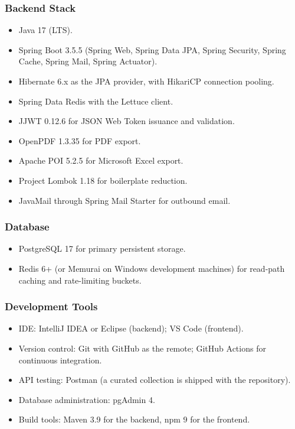 \subsubsection{Backend Stack}
\begin{itemize}
    \item Java 17 (LTS).
    \item Spring Boot 3.5.5 (Spring Web, Spring Data JPA, Spring Security, Spring Cache, Spring Mail, Spring Actuator).
    \item Hibernate 6.x as the JPA provider, with HikariCP connection pooling.
    \item Spring Data Redis with the Lettuce client.
    \item JJWT 0.12.6 for JSON Web Token issuance and validation.
    \item OpenPDF 1.3.35 for PDF export.
    \item Apache POI 5.2.5 for Microsoft Excel export.
    \item Project Lombok 1.18 for boilerplate reduction.
    \item JavaMail through Spring Mail Starter for outbound email.
\end{itemize}

\subsubsection{Database}
\begin{itemize}
    \item PostgreSQL 17 for primary persistent storage.
    \item Redis 6+ (or Memurai on Windows development machines) for read-path caching and rate-limiting buckets.
\end{itemize}

\subsubsection{Development Tools}
\begin{itemize}
    \item IDE: IntelliJ IDEA or Eclipse (backend); VS Code (frontend).
    \item Version control: Git with GitHub as the remote; GitHub Actions for continuous integration.
    \item API testing: Postman (a curated collection is shipped with the repository).
    \item Database administration: pgAdmin 4.
    \item Build tools: Maven 3.9 for the backend, npm 9 for the frontend.
\end{itemize}

